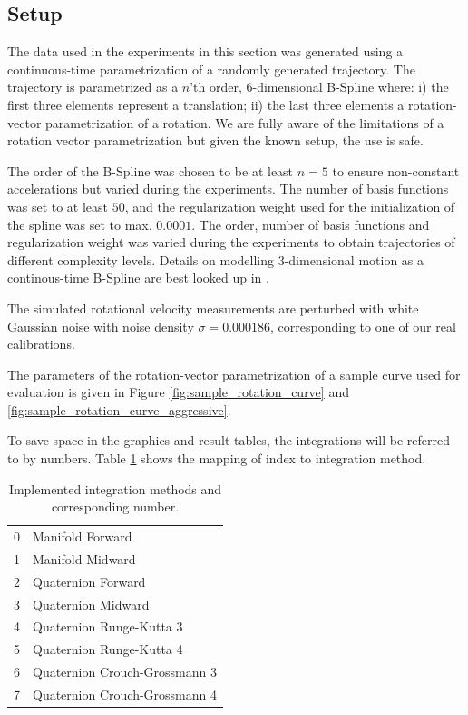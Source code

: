 \documentclass[10pt,a4paper]{article}
\numberwithin{equation}{section}
\begin{document}
\subsection{Setup}

The data used in the experiments in this section was generated using a continuous-time parametrization of a randomly generated trajectory.
The trajectory is parametrized as a $n$'th order, 6-dimensional B-Spline where: i) the first three elements represent a translation; ii) the last three elements a rotation-vector parametrization of a rotation.
We are fully aware of the limitations of a rotation vector parametrization but given the known setup, the use is safe.

The order of the B-Spline was chosen to be at least $n = 5$ to ensure non-constant accelerations but varied during the experiments.
The number of basis functions was set to at least $50$, and the regularization weight used for the initialization of the spline was set to max. $0.0001$.
The order, number of basis functions and regularization weight was varied during the experiments to obtain  trajectories of different complexity levels.
Details on modelling 3-dimensional motion as a continous-time B-Spline are best looked up in \cite{furgale}.

The simulated rotational velocity measurements are perturbed with white Gaussian noise with noise density $\sigma = 0.000186$, corresponding to one of our real calibrations.

The parameters of the rotation-vector parametrization of a sample curve used for evaluation is given in Figure \ref{fig:sample_rotation_curve} and \ref{fig:sample_rotation_curve_aggressive}.

To save space in the graphics and result tables, the integrations will be referred to by numbers. Table \ref{tbl:method_number} shows the mapping of index to integration method.

\begin{table}
\begin{center}
\begin{tabular}{ l | l }
0  & Manifold Forward \\
1  & Manifold Midward \\
2  & Quaternion Forward \\
3  & Quaternion Midward \\
4  & Quaternion Runge-Kutta 3 \\
5  & Quaternion Runge-Kutta 4 \\
6  & Quaternion Crouch-Grossmann 3\\
7  & Quaternion Crouch-Grossmann 4
\end{tabular}
\end{center}
\caption{Implemented integration methods and corresponding number.}
\label{tbl:method_number}
\end{table}
\end{document}
